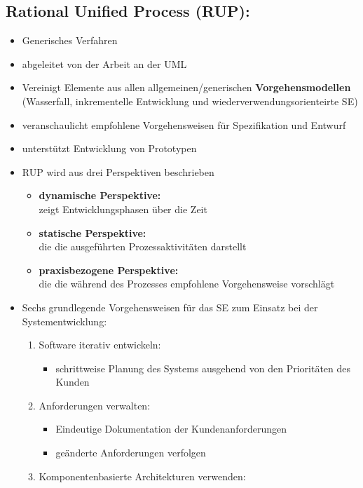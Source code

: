 \subsection{Rational Unified Process (RUP):}
\begin{itemize}
    \item Generisches Verfahren
    \item abgeleitet von der Arbeit an der UML
    \item Vereinigt Elemente aus allen allgemeinen/generischen \textbf{Vorgehensmodellen} (Wasserfall, inkrementelle Entwicklung und wiederverwendungsorienteirte SE)
    \item veranschaulicht empfohlene Vorgehensweisen für Spezifikation und Entwurf
    \item unterstützt Entwicklung von Prototypen
    \item RUP wird aus drei Perspektiven beschrieben
    \begin{itemize}
        \item \textbf{dynamische Perspektive:}\\
        zeigt Entwicklungsphasen über die Zeit
        \item \textbf{statische Perspektive:}\\
        die die ausgeführten Prozessaktivitäten darstellt
        \item \textbf{praxisbezogene Perspektive:}\\ die die während des Prozesses empfohlene Vorgehensweise vorschlägt
    \end{itemize}
    \item Sechs grundlegende Vorgehensweisen für das SE zum Einsatz bei der Systementwicklung:
    \begin{enumerate}
        \item Software iterativ entwickeln:
        \begin{itemize}
            \item schrittweise Planung des Systems ausgehend von den Prioritäten des Kunden 
        \end{itemize}
        \item Anforderungen verwalten:
        \begin{itemize}
            \item Eindeutige Dokumentation der Kundenanforderungen
            \item geänderte Anforderungen verfolgen
        \end{itemize}
        \item Komponentenbasierte Architekturen verwenden:

\end{enumerate}
\end{itemize}
